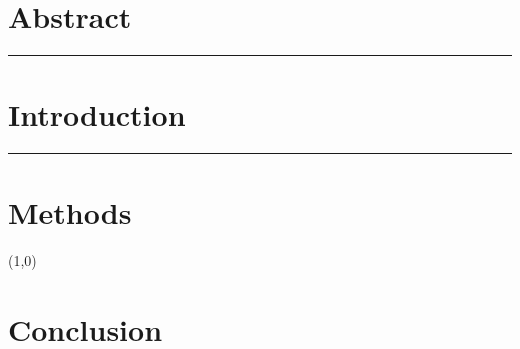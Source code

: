 \documentclass[12pt]{article}
\newcommand{\hr}[1][0.4pt] {
    \begin{center} \noindent\rule{\textwidth}{#1} \end{center}
} %
\newcommand{\hrtwo}{\begin{center} \line(1,0){\textwidth} \end{center}}
\begin{document}
\section{Abstract}
\blindtext
\hr %


\section{Introduction}
\blindtext
\textcolor{blue}{\hr[1.2pt]}


\section{Methods}
\blindtext
\hrtwo


\section{Conclusion}
\blindtext
\end{document}

